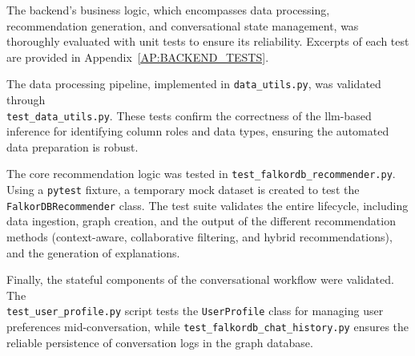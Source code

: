 The backend's business logic, which encompasses data processing, recommendation generation, and conversational state management, was thoroughly evaluated with unit tests to ensure its reliability. Excerpts of each test are provided in Appendix~\ref{AP:BACKEND_TESTS}.

The data processing pipeline, implemented in \texttt{data\_utils.py}, was validated through \\ \texttt{test\_data\_utils.py}. These tests confirm the correctness of the \acs{llm}-based inference for identifying column roles and data types, ensuring the automated data preparation is robust.

The core recommendation logic was tested in \texttt{test\_falkordb\_recommender.py}. Using a \texttt{pytest} fixture, a temporary mock dataset is created to test the \texttt{FalkorDBRecommender} class. The test suite validates the entire lifecycle, including data ingestion, graph creation, and the output of the different recommendation methods (context-aware, collaborative filtering, and hybrid recommendations), and the generation of explanations.

Finally, the stateful components of the conversational workflow were validated. The \\ \texttt{test\_user\_profile.py} script tests the \texttt{UserProfile} class for managing user preferences mid-conversation, while \texttt{test\_falkordb\_chat\_history.py} ensures the reliable persistence of conversation logs in the graph database.